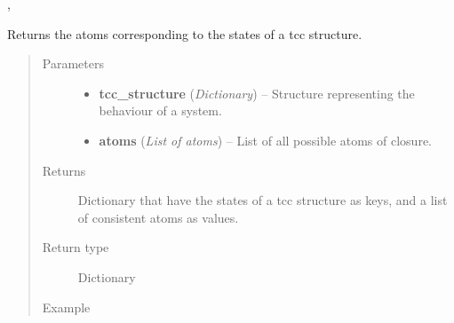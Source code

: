 \documentclass[letterpaper,10pt,english]{sphinxmanual}
\begin{document}
\begin{fulllineitems}


{\hyperref[closure:closure.getClosure]{}}, {\hyperref[formula:formula.Formula]{}}



\end{fulllineitems}


\begin{fulllineitems}
\label{modelCheckingGraph:modelCheckingGraph.getModelCheckingAtoms}
Returns the atoms corresponding to the states of a tcc structure.
\begin{quote}\begin{description}
\item[{Parameters}] \leavevmode\begin{itemize}
\item {} 
\textbf{tcc\_structure} (\emph{Dictionary}) -- Structure representing the behaviour of a system.

\item {} 
\textbf{atoms} (\emph{List of atoms}) -- List of all possible atoms of closure.

\end{itemize}

\item[{Returns}] \leavevmode
Dictionary that have the states of a tcc structure as keys, and a list of consistent atoms as values.

\item[{Return type}] \leavevmode
Dictionary

\item[{Example }] \leavevmode
\end{description}\end{quote}


\end{fulllineitems}
\end{document}

